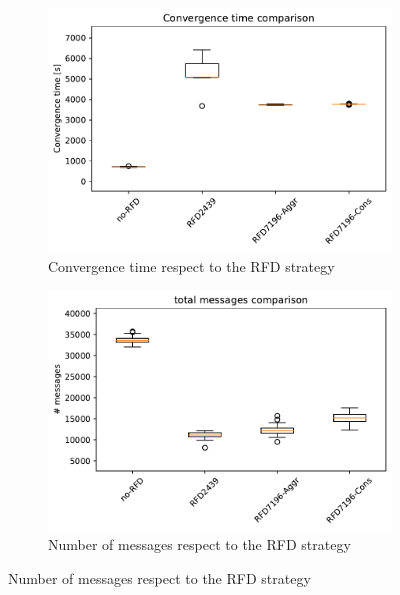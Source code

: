\begin{figure}[h]
     \centering
     \begin{subfigure}[b]{0.325\textwidth}
         \centering
         \includegraphics[width=\textwidth]{images/RFD/miceVSelephants/elephants/cisco_1000MRAI30_rfd_comparison_time_boxplot.pdf}
         \caption{Convergence time respect to the RFD strategy}
         \label{fig:1000_RFD_MRAI_30_time_elephant}
     \end{subfigure}
     \hfill
     \begin{subfigure}[b]{0.325\textwidth}
         \centering
         \includegraphics[width=\textwidth]{images/RFD/miceVSelephants/elephants/cisco_1000MRAI30_rfd_comparison_messages_boxplot.pdf}
         \caption{Number of messages respect to the RFD strategy}
         \label{fig:1000_RFD_MRAI_30_messages_elephant}

\end{subfigure}
\end{figure}
